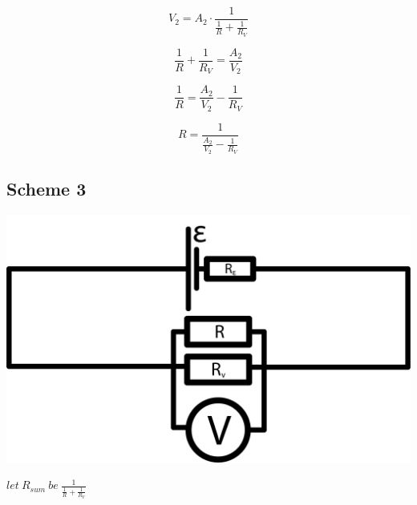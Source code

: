 \documentclass[11pt]{memoir}
\begin{document}
    \begin{equation*}
        V_2 = A_2 \cdot \frac{1}{\frac{1}{R} + \frac{1}{R_V}}
    \end{equation*}

    \begin{equation*}
        \frac{1}{R} + \frac{1}{R_V} = \frac{A_2}{V_2}
    \end{equation*}

    \begin{equation*}
        \frac{1}{R} = \frac{A_2}{V_2} - \frac{1}{R_V}
    \end{equation*}

    \begin{equation}\label{eq:equation2}
        R = \frac{1}{\frac{A_2}{V_2} - \frac{1}{R_V}}
    \end{equation}


    \newpage

    \subsection{Scheme 3}\label{subsec:scheme-3}

    \includegraphics[width=\linewidth]{../schemes/Scheme3.png}

    $let~ R_{sum} ~be~ \frac{1}{\frac{1}{R} + \frac{1}{R_V}}$
\end{document}
